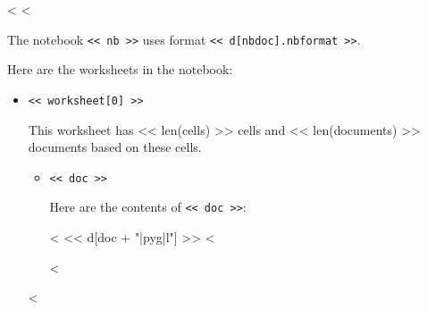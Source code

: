 \documentclass[12pt]{article}
\begin{document}
<%
<%

The notebook \verb|<< nb >>| uses format \verb|<< d[nbdoc].nbformat >>|.

Here are the worksheets in the notebook:

\begin{itemize}
<%
<%
<%

\item{\verb|<< worksheet[0] >>|}

This worksheet has << len(cells) >> cells and << len(documents) >> documents based on these cells.

\begin{itemize}
<%
\item{\verb|<< doc >>|}

Here are the contents of \verb|<< doc >>|:

<%
<< d[doc + "|pyg|l"] >>
<%

<%
\end{itemize}

<%
\end{itemize}
\end{document}

